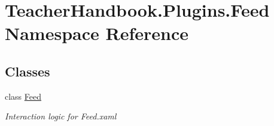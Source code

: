 \hypertarget{namespace_teacher_handbook_1_1_plugins_1_1_feed}{}\section{Teacher\+Handbook.\+Plugins.\+Feed Namespace Reference}
\label{namespace_teacher_handbook_1_1_plugins_1_1_feed}
\subsection*{Classes}
\begin{DoxyCompactItemize}
\item 
class \mbox{\hyperlink{class_teacher_handbook_1_1_plugins_1_1_feed_1_1_feed}{Feed}}
\begin{DoxyCompactList}\small\item\em Interaction logic for Feed.\+xaml \end{DoxyCompactList}\end{DoxyCompactItemize}
